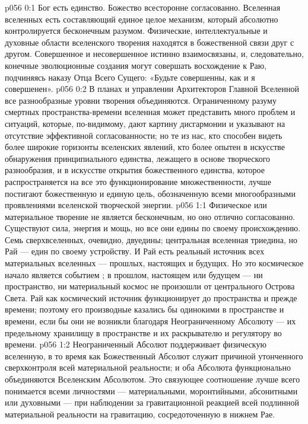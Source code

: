 \author{Могучий Вестник и Махивента Мелхиседек}
\vs p056 0:1 Бог есть единство. Божество всесторонне согласованно. Вселенная вселенных есть составляющий единое целое механизм, который абсолютно контролируется бесконечным разумом. Физические, интеллектуальные и духовные области вселенского творения находятся в божественной связи друг с другом. Совершенное и несовершенное истинно взаимосвязаны, и, следовательно, конечные эволюционные создания могут совершать восхождение к Раю, подчиняясь наказу Отца Всего Сущего: «Будьте совершенны, как и я совершенен».
\vs p056 0:2 В планах и управлении Архитекторов Главной Вселенной все разнообразные уровни творения объединяются. Ограниченному разуму смертных пространства\hyp{}времени вселенная может представить много проблем и ситуаций, которые, по\hyp{}видимому, дают картину дисгармонии и указывают на отсутствие эффективной согласованности; но те из нас, кто способен видеть более широкие горизонты вселенских явлений, кто более опытен в искусстве обнаружения принципиального единства, лежащего в основе творческого разнообразия, и в искусстве открытия божественного единства, которое распространяется на все это функционирование множественности, лучше постигают божественную и единую цель, обозначенную всеми многообразными проявлениями вселенской творческой энергии.
\vs p056 1:1 Физическое или материальное творение не является бесконечным, но оно отлично согласованно. Существуют сила, энергия и мощь, но все они едины по своему происхождению. Семь сверхвселенных, очевидно, двуедины; центральная вселенная триедина, но Рай --- един по своему устройству. И Рай есть реальный источник всех материальных вселенных --- прошлых, настоящих и будущих. Но это космическое начало является событием ;  в прошлом, настоящем или будущем --- ни пространство, ни материальный космос не произошли от центрального Острова Света. Рай как космический источник функционирует до пространства и прежде времени; поэтому его производные казались бы одинокими в пространстве и времени, если бы они не возникли благодаря Неограниченному Абсолюту --- их предельному хранилищу в пространстве и их раскрывателю и регулятору во времени.
\vs p056 1:2 \pc Неограниченный Абсолют поддерживает физическую вселенную, в то время как Божественный Абсолют служит причиной утонченного сверхконтроля всей материальной реальности; и оба Абсолюта функционально объединяются Вселенским Абсолютом. Это связующее соотношение лучше всего понимается всеми личностями --- материальными, моронтийными, абсонитными или духовными --- при наблюдении за гравитационной реакцией всей подлинной материальной реальности на гравитацию, сосредоточенную в нижнем Рае.
